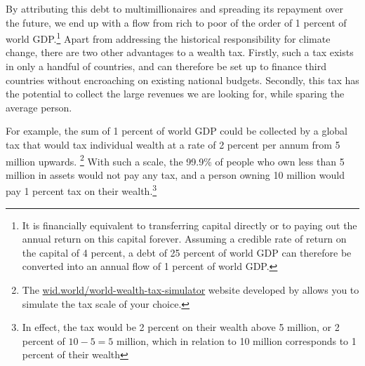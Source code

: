 \documentclass[a5paper,english,openany]{memoir}
\begin{document}
By attributing this debt to multimillionaires and spreading its repayment over the future, we end up with a flow from rich to poor of the order of %
1 percent of world GDP.\footnote{It is financially equivalent to transferring %
capital directly or to paying %
out the annual return on this capital forever. Assuming a credible rate of return on the %
capital of %
4 percent, %
a debt of 25 percent %
of world GDP can therefore be converted into an annual flow of 1 percent of world GDP.} 
Apart from addressing the historical responsibility for climate change, there are two other advantages to a wealth tax. Firstly, %
such a tax exists in only a handful of countries, and can therefore be set up to finance third countries without encroaching on existing national budgets. Secondly, this tax has the potential to collect the large revenues we are looking for, while sparing the average person. %

For example, the sum of 1 percent of world GDP could be collected by a global tax that would tax individual wealth at a rate of 2 percent per annum %
from 5 million upwards.
\footnote{
The \href{https://wid.world/world-wealth-tax-simulator/}{wid.world/world-wealth-tax-simulator} website developed by \cite{chancel_world_2022} allows you to simulate the tax scale of your choice.} %
With such a scale, the 99.9\% of people who own less than 5 million in assets would not pay any tax, and a person owning 10 million would pay 1 percent tax on their %
wealth.\footnote{In effect, the tax would be 2 percent on their %
wealth above 5 million, or 2 percent of $10-5=5$ million, which in relation to 10 million corresponds to 1 percent of their wealth  %
} 
\end{document}
